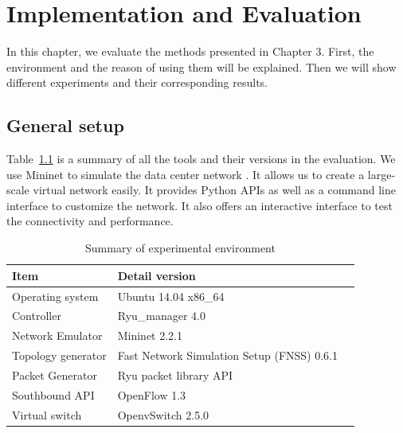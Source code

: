 \chapter{Implementation and Evaluation}
\label{Implementation_and_Evaluation}
In this chapter, we evaluate the methods presented in Chapter 3. First, the environment and the reason of using them will be explained. Then we will show different experiments and their corresponding results.

\section{General setup}
Table~\ref{table:Experiment_table} is a summary of all the tools and their versions in the evaluation. We use Mininet to simulate the data center network \cite{Mininet}. It allows us to create a large-scale virtual network easily. It provides Python APIs as well as a command line interface to customize the network. It also offers an interactive interface to test the connectivity and performance.

\begin{table}[H]
\centering
\caption{Summary of experimental environment}
\begin{tabular}{|l|p{4cm}|p{4.5cm}}
\hline Item & Detail version \\
\hline
\hline Operating system & Ubuntu 14.04 x86\_64 \\
\hline Controller & Ryu\_manager 4.0 \\
\hline Network Emulator & Mininet 2.2.1 \\
\hline Topology generator & Fast Network Simulation Setup (FNSS) 0.6.1\\
\hline Packet Generator & Ryu packet library API \\
\hline Southbound API & OpenFlow 1.3 \\
\hline Virtual switch & OpenvSwitch 2.5.0 \\
\hline 
\end{tabular}
\label{table:Experiment_table}
\end{table}

